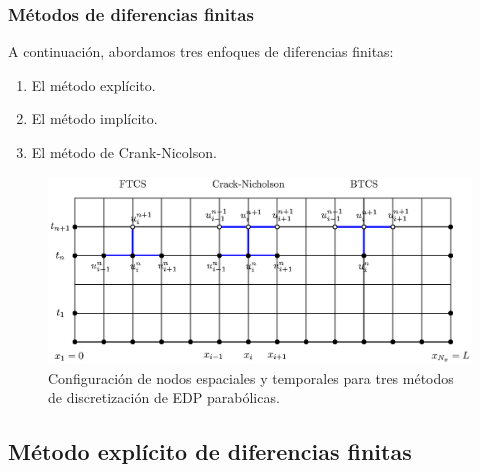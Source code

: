 \documentclass[12pt]{beamer}
\begin{document}
\begin{frame}
\frametitle{Métodos de diferencias finitas}
A continuación, abordamos tres enfoques de diferencias finitas:
\begin{enumerate}[<+->]
\item El método explícito.
\item El método implícito.
\item El método de Crank-Nicolson.
\end{enumerate}
\end{frame}
\begin{frame}
\captionsetup{font=scriptsize,labelfont=scriptsize}
\begin{figure}
	\centering
	\includegraphics[scale=0.6]{Imagenes/mallaSolucionEDP_05.eps}
	\caption{Configuración de nodos espaciales y temporales para tres métodos de discretización de EDP parabólicas.}
\end{figure}
\end{frame}

\subsection{Método explícito de diferencias finitas}
\end{document}
